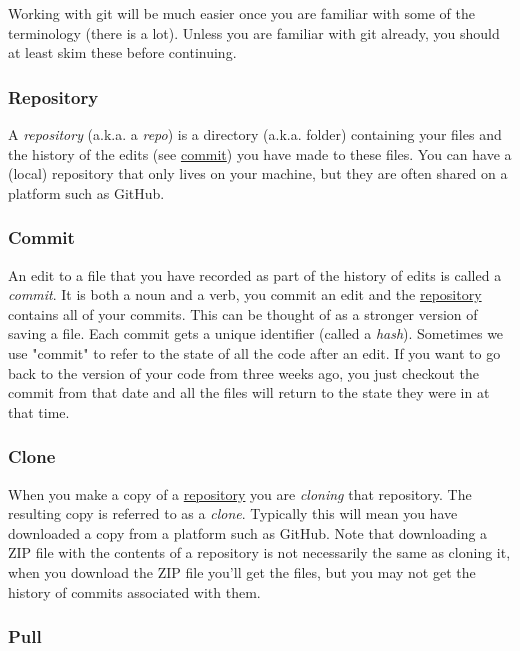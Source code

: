 \documentclass[11pt,onecolumn]{scrartcl}
\begin{document}
Working with git will be much easier once you are familiar with some of the
terminology (there is a lot). Unless you are familiar with git already, you
should at least skim these before continuing.

\subsubsection*{Repository}
\label{sec:org95d76c9}

A \emph{repository} (a.k.a. a \emph{repo}) is a directory (a.k.a. folder) containing your
files and the history of the edits (see \hyperref[sec:org84683a9]{commit}) you have made to these files.
You can have a (local) repository that only lives on your machine, but they are
often shared on a platform such as GitHub.

\subsubsection*{Commit}
\label{sec:org84683a9}

An edit to a file that you have recorded as part of the history of edits is
called a \emph{commit}. It is both a noun and a verb, you commit an edit and the
\hyperref[sec:org95d76c9]{repository} contains all of your commits. This can be thought of as a stronger
version of saving a file. Each commit gets a unique identifier (called a
\emph{hash}). Sometimes we use "commit" to refer to the state of all the code after
an edit. If you want to go back to the version of your code from three weeks
ago, you just checkout the commit from that date and all the files will return
to the state they were in at that time.

\subsubsection*{Clone}
\label{sec:org30bf8fb}

When you make a copy of a \hyperref[sec:org95d76c9]{repository} you are \emph{cloning} that repository. The
resulting copy is referred to as a \emph{clone}. Typically this will mean you have
downloaded a copy from a platform such as GitHub. Note that downloading a ZIP
file with the contents of a repository is not necessarily the same as cloning
it, when you download the ZIP file you'll get the files, but you may not get the
history of commits associated with them.

\subsubsection*{Pull}
\label{sec:orga3051e7}
\end{document}
